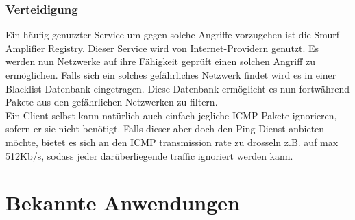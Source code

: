 \documentclass[12pt,a4paper]{article}
\begin{document}
\subsubsection*{Verteidigung}
Ein häufig genutzter Service um gegen solche Angriffe vorzugehen ist die Smurf Amplifier Registry. Dieser Service wird von Internet-Providern genutzt. Es werden nun Netzwerke auf ihre Fähigkeit geprüft einen solchen Angriff zu ermöglichen. Falls sich ein solches gefährliches Netzwerk findet wird es in einer Blacklist-Datenbank eingetragen. Diese Datenbank ermöglicht es nun fortwährend Pakete aus den gefährlichen Netzwerken zu filtern.\\
Ein Client selbst kann natürlich auch einfach jegliche ICMP-Pakete ignorieren, sofern er sie nicht benötigt. Falls dieser aber doch den Ping Dienst anbieten möchte, bietet es sich an den ICMP transmission rate zu drosseln z.B. auf max 512Kb/s, sodass jeder darüberliegende traffic ignoriert werden kann.
\section{Bekannte Anwendungen}
\end{document}

